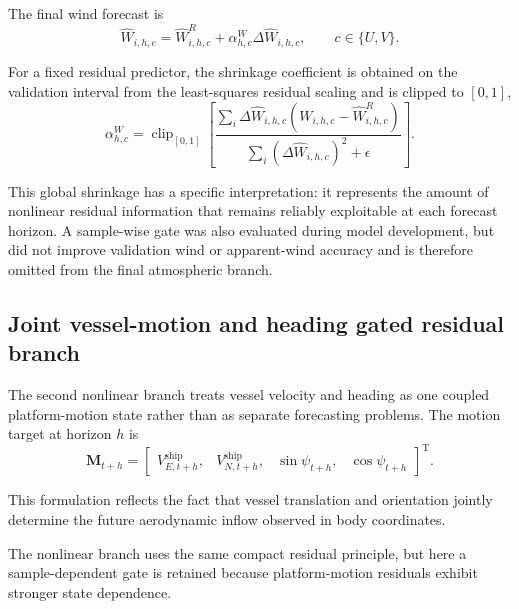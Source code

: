 The final wind forecast is
\begin{equation}
\boxed{
\hat W_{i,h,c}
=
\hat W^{R}_{i,h,c}
+
\alpha_{h,c}^{W}
\Delta\hat W_{i,h,c}
},
\qquad
c\in\{U,V\}.
\label{eq:final_wind_forecast}
\end{equation}

For a fixed residual predictor, the shrinkage coefficient is obtained on the validation interval from the least-squares residual scaling and is clipped to $[0,1]$,
\begin{equation}
\alpha_{h,c}^{W}
=
\operatorname{clip}_{[0,1]}
\left[
\frac{
\sum_i
\Delta\hat W_{i,h,c}
\left(
W_{i,h,c}
-
\hat W^R_{i,h,c}
\right)
}{
\sum_i
\left(
\Delta\hat W_{i,h,c}
\right)^2
+
\epsilon
}
\right].
\label{eq:wind_alpha}
\end{equation}

This global shrinkage has a specific interpretation: it represents the amount of nonlinear residual information that remains reliably exploitable at each forecast horizon. A sample-wise gate was also evaluated during model development, but did not improve validation wind or apparent-wind accuracy and is therefore omitted from the final atmospheric branch.

\subsection{Joint vessel-motion and heading gated residual branch}
\label{subsec:motion_residual}

The second nonlinear branch treats vessel velocity and heading as one coupled platform-motion state rather than as separate forecasting problems. The motion target at horizon $h$ is
\begin{equation}
\mathbf M_{t+h}
=
\begin{bmatrix}
V^{\mathrm{ship}}_{E,t+h},
&
V^{\mathrm{ship}}_{N,t+h},
&
\sin\psi_{t+h},
&
\cos\psi_{t+h}
\end{bmatrix}^{\mathrm T}.
\label{eq:motion_target}
\end{equation}

This formulation reflects the fact that vessel translation and orientation jointly determine the future aerodynamic inflow observed in body coordinates.

The nonlinear branch uses the same compact residual principle, but here a sample-dependent gate is retained because platform-motion residuals exhibit stronger state dependence.

